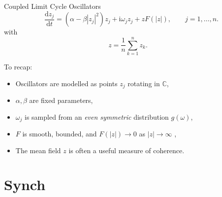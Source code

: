 \documentclass[10pt,reqno]{beamer}
\newcommand{\D}[2]{\frac{\mathrm{d} #1}{\mathrm{d} #2}}
\newcommand{\I}{\mathrm{i}}
\newcommand{\complex}{\mathbb{C}}
\begin{document}
\begin{frame}{Coupled Limit Cycle Oscillators}
\[
\quad \D{z_j}{t} = (\alpha - \beta|z_j|^2)z_j + \I\omega_jz_j +zF(|z|), \qquad j = 1,\ldots, n.
\]
with 
\[
z=\frac{1}{n}\sum_{k=1}^n z_k.
\]
\vfill

To recap:
\begin{itemize}
\item Oscillators are modelled as points $z_j$ rotating in $\complex$,
\item $\alpha, \beta$ are fixed parameters,
\item $\omega_j$ is sampled from an \emph{even symmetric} distribution $g(\omega)$,  
\item $F$ is smooth, bounded, and $F(|z|)\rightarrow 0$ as $|z|\rightarrow\infty$ ,
\item The mean field $z$ is often a useful measure of coherence.
\end{itemize}
\vfill
\end{frame}
\section{Synch}
\end{document}
